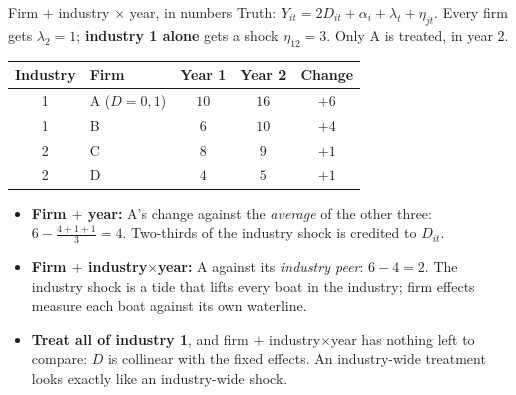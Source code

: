 \documentclass[
  11pt,
  ignorenonframetext,
  aspectratio=169,
]{beamer}
\providecommand{\tightlist}{%
  \setlength{\itemsep}{0pt}\setlength{\parskip}{0pt}}
\begin{document}
\begin{frame}{Firm \(+\) industry \(\times\) year, in numbers}
\protect{}\label{firm-industry-times-year-in-numbers}
Truth: \(Y_{it} = 2D_{it} + \alpha_i + \lambda_t + \eta_{jt}\). Every
firm gets \(\lambda_2 = 1\); \textbf{industry 1 alone} gets a shock
\(\eta_{12} = 3\). Only A is treated, in year 2.

\begin{center}\scriptsize
\begin{tabular}{clccc}
\toprule
Industry & Firm & Year 1 & Year 2 & Change \\
\midrule
1 & A \quad($D = 0, 1$) & $10$ & $16$ & $+6$ \\
1 & B & $6$ & $10$ & $+4$ \\
2 & C & $8$ & $9$ & $+1$ \\
2 & D & $4$ & $5$ & $+1$ \\
\bottomrule
\end{tabular}
\end{center}

\begin{itemize}
\tightlist
\item
  \textbf{Firm \(+\) year:} A's change against the \emph{average} of the
  other three: \(6 - \tfrac{4+1+1}{3} = 4\). Two-thirds of the industry
  shock is credited to \(D_{it}\).
\item
  \textbf{Firm \(+\) industry\(\times\)year:} A against its
  \emph{industry peer}: \(6 - 4 = 2\). The industry shock is a tide that
  lifts every boat in the industry; firm effects measure each boat
  against its own waterline.
\item
  \textbf{Treat all of industry 1}, and firm \(+\)
  industry\(\times\)year has nothing left to compare: \(D\) is collinear
  with the fixed effects. An industry-wide treatment looks exactly like
  an industry-wide shock.
\end{itemize}
\end{frame}
\end{document}
